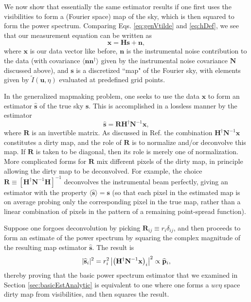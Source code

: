 \documentclass[twocolumn,aps,prd,nofootinbib,showpacs]{revtex4-1}
\begin{document}
We now show that essentially the same estimator results if one first uses the visibilities to form a (Fourier space) map of the sky, which is then squared to form the power spectrum.  Comparing  Eqs. \eqref{eq:genVtilde} and \eqref{eq:hDef}, we see that our measurement equation can be written as
\begin{equation}
\mathbf{x} = \mathbf{H} \mathbf{s} + \mathbf{n},
\end{equation}
where $\mathbf{x}$ is our data vector like before, $\mathbf{n}$ is the instrumental noise contribution to the data (with covariance $\langle \mathbf{n} \mathbf{n}^\dagger \rangle$ given by the instrumental noise covariance $\mathbf{N}$ discussed above), and $\mathbf{s}$ is a discretized ``map" of the Fourier sky, with elements given by $\widetilde{I}(\mathbf{u}, \eta)$ evaluated at predefined grid points.

In the generalized mapmaking problem, one seeks to use the data $\mathbf{x}$ to form an estimator $\widehat{\mathbf{s}}$ of the true sky $\mathbf{s}$.  This is accomplished in a lossless manner \cite{Tegmark1997a} by the estimator
\begin{equation}
\widehat{\mathbf{s}} = \mathbf{R} \mathbf{H}^{\dagger} \mathbf{N}^{-1} \mathbf{x},
\end{equation}
where $\mathbf{R}$ is an invertible matrix.  As discussed in Ref. \cite{Morales2008} the combination $\mathbf{H}^{\dagger} \mathbf{N}^{-1} \mathbf{x}$ constitutes a dirty map, and the role of $\mathbf{R}$ is to normalize and/or deconvolve this map.  If $\mathbf{R}$ is taken to be diagonal, then its role is merely one of normalization.  More complicated forms for $\mathbf{R}$ mix different pixels of the dirty map, in principle allowing the dirty map to be deconvolved.  For example, the choice $\mathbf{R} \equiv \left[ \mathbf{H}^\dagger \mathbf{N}^{-1} \mathbf{H} \right]^{-1}$ deconvolves the instrumental beam perfectly, giving an estimator with the property $\langle \hat{\mathbf{s}}  \rangle = \mathbf{s}$ (so that each pixel in the estimated map is on average probing only the corresponding pixel in the true map, rather than a linear combination of pixels in the pattern of a remaining point-spread function).

Suppose one forgoes deconvolution by picking $\mathbf{R}_{ij} \equiv r_i \delta_{ij}$, and then proceeds to form an estimate of the power spectrum by squaring the complex magnitude of the resulting map estimator $\widehat{\mathbf{s}}$.  The result is
\begin{equation}
\label{eq:SqEst2}
| \widehat{\mathbf{s}}_i |^2 = r_i^2 \, \big{|} \!\left( \mathbf{H}^{\dagger} \mathbf{N}^{-1} \mathbf{x} \right)_i \! \big{|}^2 \propto \widehat{\mathbf{p}}_i,
\end{equation}
thereby proving that the basic power spectrum estimator that we examined in Section \ref{sec:basicEstAnalytic} is equivalent to one where one forms a $uv\eta$ space dirty map from visibilities, and then squares the result.
\end{document}
